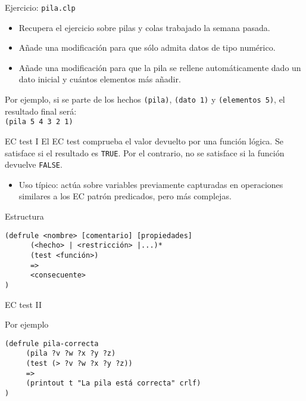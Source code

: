 \documentclass[usenames,dvipsnames,aspectratio=169]{beamer}
\begin{document}
\begin{frame}{Ejercicio: \texttt{pila.clp}}
	\begin{itemize}
		\item Recupera el ejercicio sobre pilas y colas trabajado la semana pasada.
		\item Añade una modificación para que sólo admita datos de tipo numérico.
		\item Añade una modificación para que la pila se rellene automáticamente dado un dato inicial y cuántos elementos más añadir.\\
	\end{itemize}
	Por ejemplo, si se parte de los hechos \texttt{(pila)}, \texttt{(dato 1)} y \texttt{(elementos 5)}, el resultado final será:\\
	\texttt{(pila 5 4 3 2 1)}
\end{frame}

\begin{frame}[fragile]{EC test I}
	El EC test comprueba el valor devuelto por una función lógica. Se satisface si el resultado es \texttt{TRUE}. Por el contrario, no se satisface si la función devuelve \texttt{FALSE}.
	\begin{itemize}
		\item Uso típico: actúa sobre variables previamente capturadas en operaciones similares a los EC patrón predicados, pero más complejas.
	\end{itemize}
	\begin{block}{Estructura}
		\begin{verbatim}
(defrule <nombre> [comentario] [propiedades]
      (<hecho> | <restricción> |...)*
      (test <función>)
      =>
      <consecuente>
)
		\end{verbatim}
	\end{block}
\end{frame}

\begin{frame}[fragile]{EC test II}
	\begin{exampleblock}{Por ejemplo}
		\begin{verbatim}
(defrule pila-correcta
     (pila ?v ?w ?x ?y ?z)
     (test (> ?v ?w ?x ?y ?z))
     =>
     (printout t "La pila está correcta" crlf)
)
		\end{verbatim}
	\end{exampleblock}
\end{frame}
\end{document}
